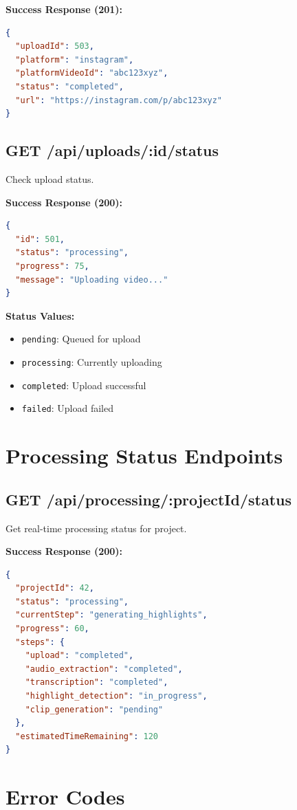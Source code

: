 \textbf{Success Response (201):}
\begin{lstlisting}[language=JSON]
{
  "uploadId": 503,
  "platform": "instagram",
  "platformVideoId": "abc123xyz",
  "status": "completed",
  "url": "https://instagram.com/p/abc123xyz"
}
\end{lstlisting}

\subsection{GET /api/uploads/:id/status}

Check upload status.

\textbf{Success Response (200):}
\begin{lstlisting}[language=JSON]
{
  "id": 501,
  "status": "processing",
  "progress": 75,
  "message": "Uploading video..."
}
\end{lstlisting}

\textbf{Status Values:}
\begin{itemize}
    \item \texttt{pending}: Queued for upload
    \item \texttt{processing}: Currently uploading
    \item \texttt{completed}: Upload successful
    \item \texttt{failed}: Upload failed
\end{itemize}

\section{Processing Status Endpoints}

\subsection{GET /api/processing/:projectId/status}

Get real-time processing status for project.

\textbf{Success Response (200):}
\begin{lstlisting}[language=JSON]
{
  "projectId": 42,
  "status": "processing",
  "currentStep": "generating_highlights",
  "progress": 60,
  "steps": {
    "upload": "completed",
    "audio_extraction": "completed",
    "transcription": "completed",
    "highlight_detection": "in_progress",
    "clip_generation": "pending"
  },
  "estimatedTimeRemaining": 120
}
\end{lstlisting}

\section{Error Codes}

